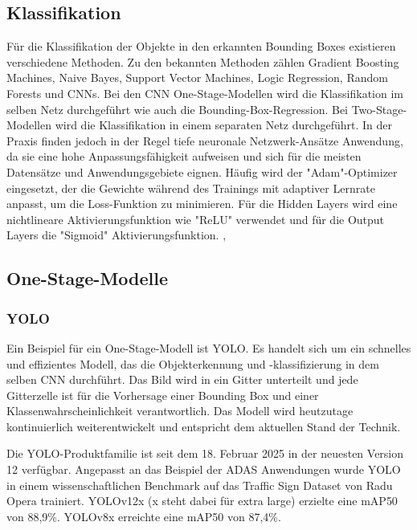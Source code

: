 \subsection{Klassifikation}

Für die Klassifikation der Objekte in den erkannten Bounding Boxes existieren verschiedene Methoden. Zu den bekannten Methoden zählen Gradient Boosting Machines, Naive Bayes, Support Vector Machines, Logic Regression, Random Forests und \acp{CNN}. \cite{driverClassification} Bei den \ac{CNN} One-Stage-Modellen wird die Klassifikation im selben Netz durchgeführt wie auch die Bounding-Box-Regression. Bei Two-Stage-Modellen wird die Klassifikation in einem separaten Netz durchgeführt. \cite{DeLasHeras2021AdvancedDA} In der Praxis finden jedoch in der Regel tiefe neuronale Netzwerk-Ansätze Anwendung, da sie eine hohe Anpassungsfähigkeit aufweisen und sich für die meisten Datensätze und Anwendungsgebiete eignen. \cite{driverClassification} Häufig wird der "Adam"-Optimizer eingesetzt, der die Gewichte während des Trainings mit adaptiver Lernrate anpasst, um die Loss-Funktion zu minimieren. Für die Hidden Layers wird eine nichtlineare Aktivierungsfunktion wie "ReLU" verwendet und für die Output Layers die "Sigmoid" Aktivierungsfunktion. \cite{liebgott2022}, \cite{driverClassification}

\subsection{One-Stage-Modelle}

\subsubsection{YOLO}

Ein Beispiel für ein One-Stage-Modell ist \ac{YOLO}. Es handelt sich um ein schnelles und effizientes Modell, das die Objekterkennung und -klassifizierung in dem selben \ac{CNN} durchführt. Das Bild wird in ein Gitter unterteilt und jede Gitterzelle ist für die Vorhersage einer Bounding Box und einer Klassenwahrscheinlichkeit verantwortlich. Das Modell wird heutzutage kontinuierlich weiterentwickelt und entspricht dem aktuellen Stand der Technik. \cite{YOLO} 

Die \ac{YOLO}-Produktfamilie ist seit dem 18. Februar 2025 in der neuesten Version 12 verfügbar. Angepasst an das Beispiel der \ac{ADAS} Anwendungen wurde \ac{YOLO} in einem wissenschaftlichen Benchmark auf das Traffic Sign Dataset von Radu Opera trainiert. YOLOv12x (x steht dabei für extra large) erzielte eine \ac{mAP}50 von 88,9\%. YOLOv8x erreichte eine \ac{mAP}50 von 87,4\%. \cite{benchmark} 

